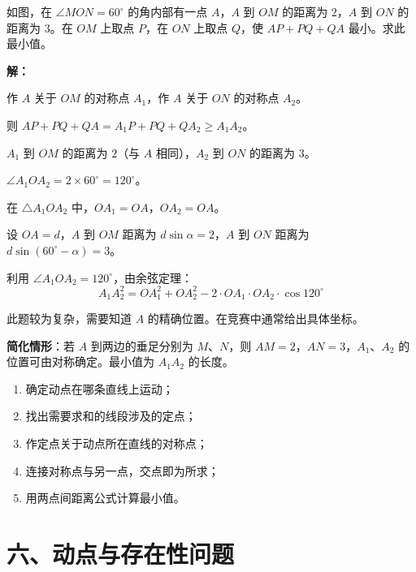 \documentclass[12pt, a4paper]{ctexart}
\begin{document}
\begin{examplebox}[【例14】角内最短路径]
如图，在 $\angle MON=60^\circ$ 的角内部有一点 $A$，$A$ 到 $OM$ 的距离为 $2$，$A$ 到 $ON$ 的距离为 $3$。在 $OM$ 上取点 $P$，在 $ON$ 上取点 $Q$，使 $AP+PQ+QA$ 最小。求此最小值。

\textbf{解：}

作 $A$ 关于 $OM$ 的对称点 $A_1$，作 $A$ 关于 $ON$ 的对称点 $A_2$。

则 $AP+PQ+QA=A_1P+PQ+QA_2\ge A_1A_2$。

$A_1$ 到 $OM$ 的距离为 $2$（与 $A$ 相同），$A_2$ 到 $ON$ 的距离为 $3$。

$\angle A_1OA_2=2\times 60^\circ=120^\circ$。

在 $\triangle A_1OA_2$ 中，$OA_1=OA$，$OA_2=OA$。

设 $OA=d$，$A$ 到 $OM$ 距离为 $d\sin\alpha=2$，$A$ 到 $ON$ 距离为 $d\sin(60^\circ-\alpha)=3$。

利用 $\angle A_1OA_2=120^\circ$，由余弦定理：
\[A_1A_2^2=OA_1^2+OA_2^2-2\cdot OA_1\cdot OA_2\cdot\cos 120^\circ\]

此题较为复杂，需要知道 $A$ 的精确位置。在竞赛中通常给出具体坐标。

\textbf{简化情形}：若 $A$ 到两边的垂足分别为 $M$、$N$，则 $AM=2$，$AN=3$，$A_1$、$A_2$ 的位置可由对称确定。最小值为 $A_1A_2$ 的长度。
\end{examplebox}

\begin{tipbox}[将军饮马解题步骤]
\begin{enumerate}[label=\textbf{Step \arabic*:}]
  \item 确定动点在哪条直线上运动；
  \item 找出需要求和的线段涉及的定点；
  \item 作定点关于动点所在直线的对称点；
  \item 连接对称点与另一点，交点即为所求；
  \item 用两点间距离公式计算最小值。
\end{enumerate}
\end{tipbox}

\newpage

\section*{\textcolor{mainblue}{六、动点与存在性问题}}
\end{document}

